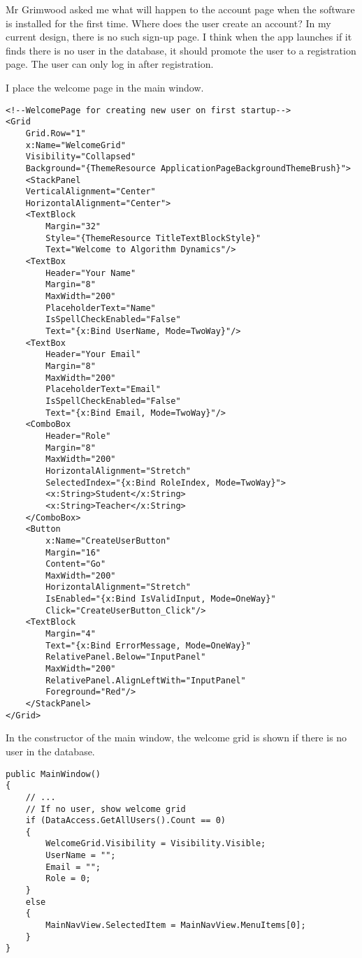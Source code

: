 \documentclass[report.tex]{subfiles}
\begin{document}
Mr Grimwood asked me what will happen to the account page when the software is installed for the first time. Where does the user create an account? In my current design, there is no such sign-up page. I think when the app launches if it finds there is no user in the database, it should promote the user to a registration page. The user can only log in after registration.

I place the welcome page in the main window.

\begin{verbatim}
<!--WelcomePage for creating new user on first startup-->
<Grid
    Grid.Row="1"
    x:Name="WelcomeGrid"
    Visibility="Collapsed"
    Background="{ThemeResource ApplicationPageBackgroundThemeBrush}">
    <StackPanel
    VerticalAlignment="Center"
    HorizontalAlignment="Center">
    <TextBlock 
        Margin="32"
        Style="{ThemeResource TitleTextBlockStyle}"
        Text="Welcome to Algorithm Dynamics"/>
    <TextBox
        Header="Your Name"
        Margin="8"
        MaxWidth="200"
        PlaceholderText="Name"
        IsSpellCheckEnabled="False"
        Text="{x:Bind UserName, Mode=TwoWay}"/>
    <TextBox
        Header="Your Email"
        Margin="8"
        MaxWidth="200"
        PlaceholderText="Email"
        IsSpellCheckEnabled="False"
        Text="{x:Bind Email, Mode=TwoWay}"/>
    <ComboBox
        Header="Role"
        Margin="8"
        MaxWidth="200"
        HorizontalAlignment="Stretch"
        SelectedIndex="{x:Bind RoleIndex, Mode=TwoWay}">
        <x:String>Student</x:String>
        <x:String>Teacher</x:String>
    </ComboBox>
    <Button 
        x:Name="CreateUserButton"
        Margin="16"
        Content="Go"
        MaxWidth="200"
        HorizontalAlignment="Stretch"
        IsEnabled="{x:Bind IsValidInput, Mode=OneWay}"
        Click="CreateUserButton_Click"/>
    <TextBlock
        Margin="4"
        Text="{x:Bind ErrorMessage, Mode=OneWay}"
        RelativePanel.Below="InputPanel"
        MaxWidth="200"
        RelativePanel.AlignLeftWith="InputPanel"
        Foreground="Red"/>
    </StackPanel>
</Grid>
\end{verbatim}

In the constructor of the main window, the welcome grid is shown if there is no user in the database.

\begin{verbatim}
public MainWindow()
{
    // ...
    // If no user, show welcome grid
    if (DataAccess.GetAllUsers().Count == 0)
    {
        WelcomeGrid.Visibility = Visibility.Visible;
        UserName = "";
        Email = "";
        Role = 0;
    }
    else
    {
        MainNavView.SelectedItem = MainNavView.MenuItems[0];
    }
}
\end{verbatim}
\end{document}
